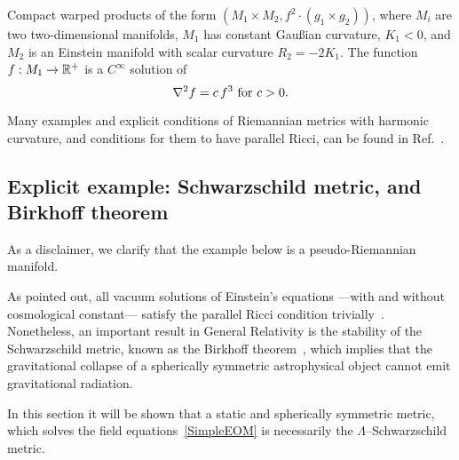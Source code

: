 Compact warped products of the form \mbox{$(M_1 \times M_2, f^{2} \cdot (g_1 \times g_2) )$,} where $M_i$ are two two-dimensional manifolds, $M_1$ has constant Gau\ss{}ian curvature, $K_1 < 0$, and $M_2$ is an Einstein manifold with scalar curvature $R_2 = - 2 K_1$. The function $f: M_1 \to \mathbb{R}^+$ is a $C^\infty$ solution of 
\begin{equation*}
  \nabla^2 f = c \, f^3 \text{ for } c > 0.
\end{equation*}

Many examples and explicit conditions of Riemannian metrics with harmonic curvature, and conditions for them to have parallel Ricci, can be found in Ref.~\cite{derdzinski1988riemannian}.





\subsection{Explicit example: Schwarzschild metric, and Birkhoff theorem\label{Ex:sch}}

As a disclaimer, we clarify that the example below is a pseudo-Riemannian manifold.


As pointed out, all vacuum solutions of Einstein's equations ---with and without cosmological constant--- satisfy the parallel Ricci condition trivially~\cite{bourguignon1981varietes}. Nonetheless, an important result in General Relativity is the stability of the Schwarzschild metric, known as the Birkhoff theorem~\cite{Jebsen1921,Birkhoff1923,Alexandrow1923,Eisland1925}, which implies that the gravitational collapse of a spherically symmetric astrophysical object cannot emit gravitational radiation.

In this section it will be shown that a static and spherically symmetric metric, which solves the field equations~\eqref{SimpleEOM} is necessarily the $\Lambda$--Schwarzschild metric.

